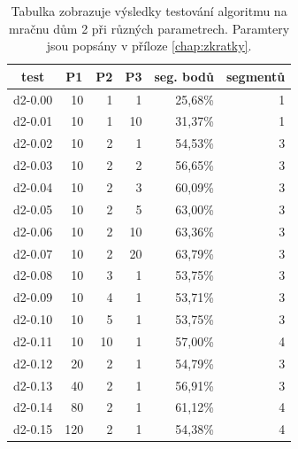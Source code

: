 \documentclass[11pt,twoside,a4paper]{book}
\begin{document}
\begin{table}[H]
\begin{center}
\begin{tabular}{|r|r|r|r|r|r|}
\hline
\multicolumn{1}{|c|}{test} & \multicolumn{1}{c|}{P1} & \multicolumn{1}{c|}{P2} & \multicolumn{1}{c|}{P3} & \multicolumn{1}{c|}{seg. bodů} & \multicolumn{1}{c|}{segmentů} \\ \hline
d2-0.00 & 10 & 1 & 1 & 25,68\% & 1 \\ \hline
d2-0.01 & 10 & 1 & 10 & 31,37\% & 1 \\ \hline
d2-0.02 & 10 & 2 & 1 & 54,53\% & 3 \\ \hline
d2-0.03 & 10 & 2 & 2 & 56,65\% & 3 \\ \hline
d2-0.04 & 10 & 2 & 3 & 60,09\% & 3 \\ \hline
d2-0.05 & 10 & 2 & 5 & 63,00\% & 3 \\ \hline
d2-0.06 & 10 & 2 & 10 & 63,36\% & 3 \\ \hline
d2-0.07 & 10 & 2 & 20 & 63,79\% & 3 \\ \hline
d2-0.08 & 10 & 3 & 1 & 53,75\% & 3 \\ \hline
d2-0.09 & 10 & 4 & 1 & 53,71\% & 3 \\ \hline
d2-0.10 & 10 & 5 & 1 & 53,75\% & 3 \\ \hline
d2-0.11 & 10 & 10 & 1 & 57,00\% & 4 \\ \hline
d2-0.12 & 20 & 2 & 1 & 54,79\% & 3 \\ \hline
d2-0.13 & 40 & 2 & 1 & 56,91\% & 3 \\ \hline
d2-0.14 & 80 & 2 & 1 & 61,12\% & 4 \\ \hline
d2-0.15 & 120 & 2 & 1 & 54,38\% & 4 \\ \hline
\end{tabular}
\caption{Tabulka zobrazuje výsledky testování algoritmu na mračnu dům 2 při různých parametrech. Paramtery jsou popsány v příloze \ref{chap:zkratky}.} 
\label{table:test2-param-d2}
\end{center}
\end{table}
\end{document}
